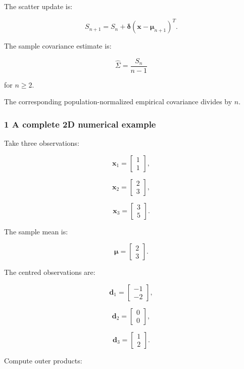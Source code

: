 The scatter update is:

\[
 \boxed{ S_{n+1} = S_n+ \boldsymbol\delta (\mathbf x-\boldsymbol\mu_{n+1})^T }.
\]

The sample covariance estimate is:

\[
 \boxed{ \widehat\Sigma= \frac{S_n}{n-1} }
\]

for \(n\ge2\).

The corresponding population-normalized empirical covariance divides by \(n\).

\subsubsection{1 A complete 2D numerical example}\label{02-foundations-ii-ch031-a-complete-2d-numerical-example}

Take three observations:

\[
 \mathbf x_1= \begin{bmatrix}1\\1\end{bmatrix},
\]

\[
 \mathbf x_2= \begin{bmatrix}2\\3\end{bmatrix},
\]

\[
 \mathbf x_3= \begin{bmatrix}3\\5\end{bmatrix}.
\]

The sample mean is:

\[
 \boldsymbol\mu= \begin{bmatrix}2\\3\end{bmatrix}.
\]

The centred observations are:

\[
 \mathbf d_1= \begin{bmatrix}-1\\-2\end{bmatrix},
\]

\[
 \mathbf d_2= \begin{bmatrix}0\\0\end{bmatrix},
\]

\[
 \mathbf d_3= \begin{bmatrix}1\\2\end{bmatrix}.
\]

Compute outer products:

